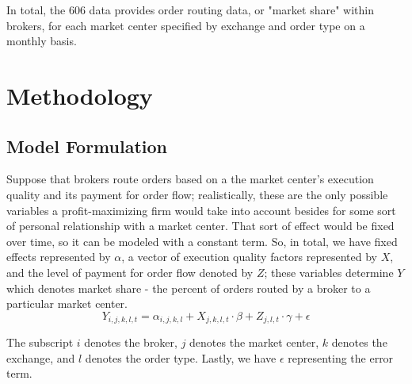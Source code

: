 \documentclass[11pt,a4paper]{article}
\begin{document}
		In total, the 606 data provides order routing data, or "market share" within brokers, for each market center specified by exchange and order type on a monthly basis. 


	
\pagebreak
\section{Methodology}

	\subsection{Model Formulation}

	Suppose that brokers route orders based on a the market center's execution quality and its payment for order flow; realistically, these are the only possible variables a profit-maximizing firm would take into account besides for some sort of personal relationship with a market center. That sort of effect would be fixed over time, so it can be modeled with a constant term. So, in total, we have fixed effects represented by $\alpha$, a vector of execution quality factors represented by $X$, and the level of payment for order flow denoted by $Z$; these variables determine $Y$ which denotes market share - the percent of orders routed by a broker to a particular market center. 
	\begin{equation}
	Y_{i, j, k, l, t} = \alpha_{i,j,k,l} +  X_{j, k, l, t} \cdot \beta +   Z_{j, l, t} \cdot \gamma + \epsilon
	\end{equation}	
	
	The subscript $i$ denotes the broker, $j$ denotes the market center, $k$ denotes the exchange, and $l$ denotes the order type. Lastly, we have $\epsilon$ representing the error term.
	
\end{document}
